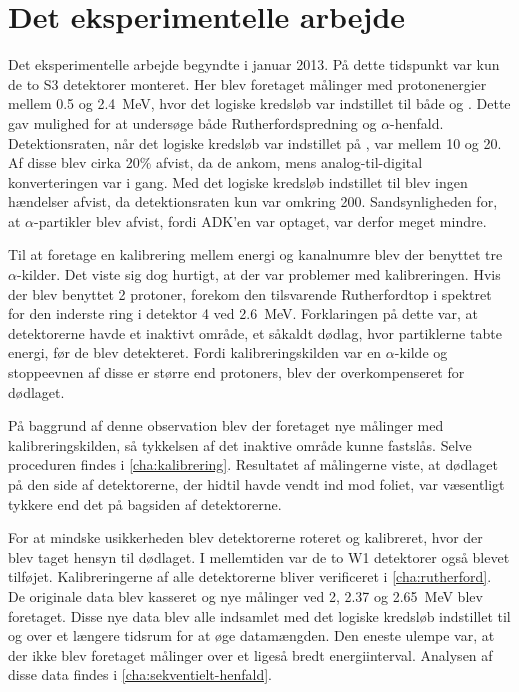 \chapter{Det eksperimentelle arbejde}
\label{cha:eksp}

Det eksperimentelle arbejde begyndte i januar 2013. På dette tidspunkt var kun de to S3 detektorer
monteret. Her blev foretaget målinger med protonenergier mellem \num{0.5} og \SI{2.4}{\MeV}, hvor
det logiske kredsløb var indstillet til både \lAND og \lOR. Dette gav mulighed for at undersøge både
Rutherfordspredning og $\alpha$-henfald. Detektionsraten, når det logiske kredsløb var indstillet på \lOR,
var mellem 10 og 20\kHz. Af disse blev cirka 20\% afvist, da de ankom, mens analog-til-digital
konverteringen var i gang. Med det logiske kredsløb indstillet til \lAND blev ingen hændelser afvist,
da detektionsraten kun var omkring 200\Hz. Sandsynligheden for, at $\alpha$-partikler blev afvist, fordi
ADK'en var optaget, var derfor meget mindre.

Til at foretage en kalibrering mellem energi og kanalnumre blev der benyttet tre $\alpha$-kilder. Det
viste sig dog hurtigt, at der var problemer med kalibreringen. Hvis der blev benyttet 2\MeV
protoner, forekom den tilsvarende Rutherfordtop i spektret for den inderste ring i detektor 4 ved
\SI{2.6}{\MeV}. Forklaringen på dette var, at detektorerne havde et inaktivt område, et såkaldt
dødlag, hvor partiklerne tabte energi, før de blev detekteret. Fordi kalibreringskilden var en
$\alpha$-kilde og stoppeevnen af disse er større end protoners, blev der overkompenseret for dødlaget.

På baggrund af denne observation blev der foretaget nye målinger med kalibreringskilden, så
tykkelsen af det inaktive område kunne fastslås. Selve proceduren findes i
\cref{cha:kalibrering}. Resultatet af målingerne viste, at dødlaget på den side af detektorerne, der
hidtil havde vendt ind mod foliet, var væsentligt tykkere end det på bagsiden af detektorerne. 

For at mindske usikkerheden blev detektorerne roteret og kalibreret, hvor der blev taget hensyn til
dødlaget.  I mellemtiden var de to W1 detektorer også blevet tilføjet. Kalibreringerne af alle
detektorerne bliver verificeret i \cref{cha:rutherford}. De originale data blev kasseret og nye
målinger ved 2, \num{2.37} og \SI{2.65}{\MeV} blev foretaget. Disse nye data blev alle
indsamlet med det logiske kredsløb indstillet til \lAND og over et længere tidsrum for at øge
datamængden. Den eneste ulempe var, at der ikke blev foretaget målinger over et ligeså bredt
energiinterval. Analysen af disse data findes i \cref{cha:sekventielt-henfald}.

